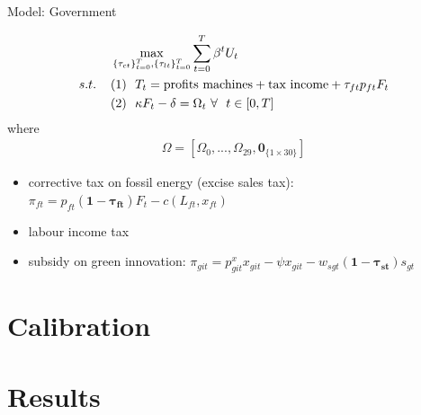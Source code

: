 \documentclass[11pt,aspectratio=169]{beamer}
\begin{document}
\begin{frame}{Model: Government}

\begin{align*}
&\max_{\{\tau_{ct}\}_{t=0}^{T}, \{\tau_{lt}\}_{t=0}^{T}} \sum_{t=0}^{T}\beta^t U_{t}\\
s.t. \hspace{4mm}
&(1)\ \ T_t= \text{profits machines}+\text{tax income}+\tau_{ft}p_{ft}F_{t}\\
&
(2)\ \ \kappa F_t-\delta =\Omega_t\  \forall\ \  t\in[0,T]
\end{align*}
where 
\begin{align*}
\Omega =\left[\Omega_0,..., \Omega_{29}, \pmb{0}_{\{1\times 30\}}\right]
\end{align*}
	\begin{itemize}
	\item corrective tax on fossil energy (excise sales tax): $\pi_{ft}=p_{ft}\pmb{(1-\tau_{ft})}F_t-c(L_{ft}, x_{ft})$
	\item labour income tax
	\item subsidy on green innovation: $\pi_{git}=p_{git}^x x_{git}-\psi x_{git}-w_{sgt}\pmb{(1-\tau_{st})}s_{gt}$
\end{itemize}
\end{frame}

\section{Calibration}


\section{Results}
\end{document}
